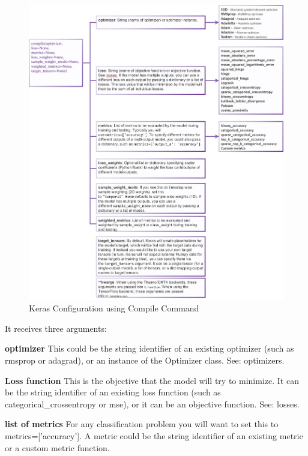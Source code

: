 \begin{figure}[!h]
\centering
\includegraphics*[]{./Figure/KerasCompileModel.jpg}
\caption{Keras Configuration using Compile Command}
\label{fg:keras_compilation} 
\end{figure}

It receives three arguments:
\begin{description}


\item{\textbf{ optimizer}} This could be the string identifier of an existing optimizer (such as rmsprop or adagrad), or an instance of the Optimizer class. See: optimizers.
\item{\textbf{Loss function}} This is the objective that the model will try to minimize. It can be the string identifier of an existing loss function (such as categorical_crossentropy or mse), or it can be an objective function. See: losses.
\item{\textbf{list of metrics}} For any classification problem you will want to set this to metrics=['accuracy']. A metric could be the string identifier of an existing metric or a custom metric function.
\end{description}

